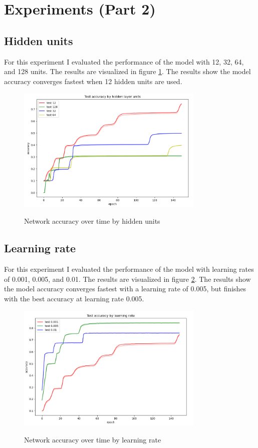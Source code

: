 \documentclass{article}
\begin{document}
\section{Experiments (Part 2)}

\subsection{Hidden units}
For this experiment I evaluated the performance of the model with 12, 32, 64, and 128 units. The results are visualized in figure \ref{fig:units}. The results show the model accuracy converges fastest when 12 hidden units are used.

\begin{figure}[H]
    \centering
    \includegraphics[width=0.8\textwidth]{part2/experiments/units/units.png}
    \label{fig:units}
    \caption{Network accuracy over time by hidden units}
\end{figure}

\subsection{Learning rate}
For this experiment I evaluated the performance of the model with learning rates of 0.001, 0.005, and 0.01. The results are visualized in figure \ref{fig:lr}. The results show the model accuracy converges fastest with a learning rate of 0.005, but finishes with the best accuracy at learning rate 0.005.

\begin{figure}[H]
    \centering
    \includegraphics[width=0.8\textwidth]{part2/experiments/lr/lr_000.png}
    \label{fig:lr}
    \caption{Network accuracy over time by learning rate}
\end{figure}
\end{document}
